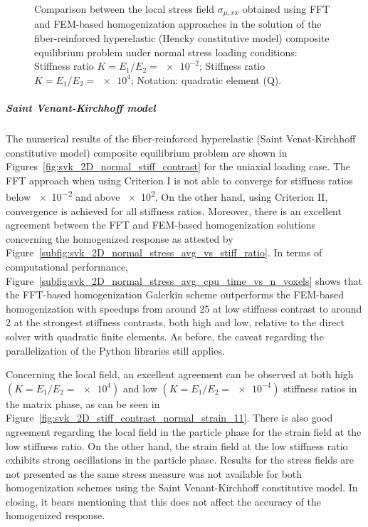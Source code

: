 \begin{figure}[hbt]
\begin{subfigure}[b]{\textwidth}
    \caption{}
    \label{subfig:hencky_2D_ratio_-4_normal_stress_11}
  \end{subfigure}
  \caption{Comparison between the local stress field \(\sigma_{\mu,xx}\) obtained using
  FFT and FEM-based homogenization approaches in the solution of the fiber-reinforced
  hyperelastic (Hencky constitutive model) composite equilibrium problem under normal stress loading conditions:
   Stiffness ratio \(K=E_1/E_2=\num{e-2}\);
   Stiffness ratio \(K=E_1/E_2=\num{e4}\);
  Notation: quadratic element (Q).}
\label{fig:hencky_2D_stiff_contrast_normal_strain_11}
\end{figure}

\FloatBarrier

\subparagraph{Saint Venant-Kirchhoff model}

The numerical results of the fiber-reinforced hyperelastic (Saint Venat-Kirchhoff constitutive model) composite equilibrium problem are shown in Figures~\ref{fig:svk_2D_normal_stiff_contrast} for the uniaxial loading case.
The FFT approach when using Criterion I is not able to converge for stiffness ratios below \num{e-2} and above \num{e2}.
On the other hand, using Criterion II, convergence is achieved for all stiffness ratios.
Moreover, there is an excellent agreement between the FFT and FEM-based homogenization solutions concerning the homogenized response as attested by Figure~\ref{subfig:svk_2D_normal_stress_avg_vs_stiff_ratio}.
In terms of computational performance, Figure~\ref{subfig:svk_2D_normal_stress_avg_cpu_time_vs_n_voxels} shows that the FFT-based homogenization Galerkin scheme outperforms the FEM-based homogenization with speedups from around 25 at low stiffness contrast to around 2 at the strongest stiffness contrasts, both high and low, relative to the direct solver with quadratic finite elements.
As before, the caveat regarding the parallelization of the Python libraries still applies.

Concerning the local field, an excellent agreement can be observed at both high \((K=E_1/E_2=\num{e4})\) and low \((K=E_1/E_2=\num{e-4})\) stiffness ratios in the matrix phase, as can be seen in Figure~\ref{fig:svk_2D_stiff_contrast_normal_strain_11}.
There is also good agreement regarding the local field in the particle phase for the strain field at the low stiffness ratio.
On the other hand, the strain field at the low stiffness ratio exhibits strong oscillations in the particle phase.
Results for the stress fields are not presented as the same stress measure was not available for both homogenization schemes using the Saint Venant-Kirchhoff constitutive model.
In closing, it bears mentioning that this does not affect the accuracy of the homogenized response.


